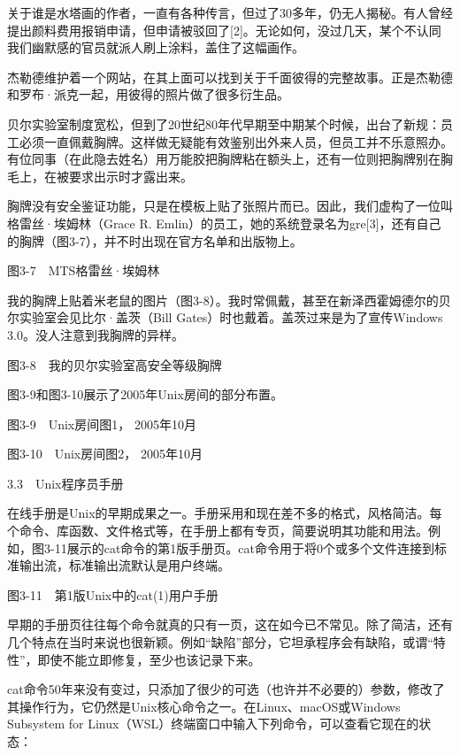 \documentclass[a4paper,12pt,UTF8,twoside]{ctexbook}
\begin{document}
{关于谁是水塔画的作者，一直有各种传言，但过了30多年，仍无人揭秘。有人曾经提出颜料费用报销申请，但申请被驳回了[2]。无论如何，没过几天，某个不认同我们幽默感的官员就派人刷上涂料，盖住了这幅画作。

杰勒德维护着一个网站，在其上面可以找到关于千面彼得的完整故事。正是杰勒德和罗布·派克一起，用彼得的照片做了很多衍生品。

贝尔实验室制度宽松，但到了20世纪80年代早期至中期某个时候，出台了新规：员工必须一直佩戴胸牌。这样做无疑能有效鉴别出外来人员，但员工并不乐意照办。有位同事（在此隐去姓名）用万能胶把胸牌粘在额头上，还有一位则把胸牌别在胸毛上，在被要求出示时才露出来。

胸牌没有安全鉴证功能，只是在模板上贴了张照片而已。因此，我们虚构了一位叫格雷丝·埃姆林（Grace R. Emlin）的员工，她的系统登录名为gre[3]，还有自己的胸牌（图3-7），并不时出现在官方名单和出版物上。



图3-7　MTS格雷丝·埃姆林

我的胸牌上贴着米老鼠的图片（图3-8）。我时常佩戴，甚至在新泽西霍姆德尔的贝尔实验室会见比尔·盖茨（Bill Gates）时也戴着。盖茨过来是为了宣传Windows 3.0。没人注意到我胸牌的异样。



图3-8　我的贝尔实验室高安全等级胸牌

图3-9和图3-10展示了2005年Unix房间的部分布置。



图3-9　Unix房间图1， 2005年10月



图3-10　Unix房间图2， 2005年10月





3.3　Unix程序员手册


在线手册是Unix的早期成果之一。手册采用和现在差不多的格式，风格简洁。每个命令、库函数、文件格式等，在手册上都有专页，简要说明其功能和用法。例如，图3-11展示的cat命令的第1版手册页。cat命令用于将0个或多个文件连接到标准输出流，标准输出流默认是用户终端。



图3-11　第1版Unix中的cat(1)用户手册

早期的手册页往往每个命令就真的只有一页，这在如今已不常见。除了简洁，还有几个特点在当时来说也很新颖。例如“缺陷”部分，它坦承程序会有缺陷，或谓“特性”，即使不能立即修复，至少也该记录下来。

cat命令50年来没有变过，只添加了很少的可选（也许并不必要的）参数，修改了其操作行为，它仍然是Unix核心命令之一。在Linux、macOS或Windows Subsystem for Linux（WSL）终端窗口中输入下列命令，可以查看它现在的状态：

}
\end{document}
